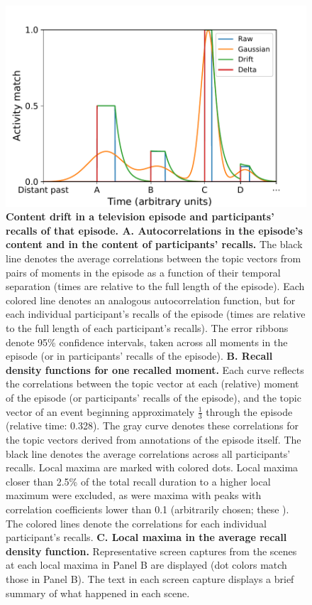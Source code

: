 \documentclass{article}
\begin{document}
\begin{figure}[tp] \centering \includegraphics[width=\textwidth]{figs/reinstatement} \caption{\textbf{Content drift in a television episode and participants' recalls of that episode.  A.  Autocorrelations in the episode's content and in the content of participants' recalls.}  The black line denotes the average correlations between the topic vectors from pairs of moments in the episode as a function of their temporal separation (times are relative to the full length of the episode).  Each colored line denotes an analogous autocorrelation function, but for each individual participant's recalls of the episode (times are relative to the full length of each participant's recalls).  The error ribbons denote 95\% confidence intervals, taken across all moments in the episode (or in participants' recalls of the episode).  \textbf{B. Recall density functions for one recalled moment.} Each curve reflects the correlations between the topic vector at each (relative) moment of the episode (or participants' recalls of the episode), and the topic vector of an event beginning approximately $\frac{1}{3}$ through the episode (relative time: 0.328).  The gray curve denotes these correlations for the topic vectors derived from annotations of the episode itself. The black line denotes the average correlations across all participants' recalls.  Local maxima are marked with colored dots.  Local maxima closer than 2.5\% of the total recall duration to a higher local maximum were excluded, as were maxima with peaks with correlation coefficients lower than 0.1 (arbitrarily chosen; these ).   The colored lines denote the correlations for each individual participant's recalls.  \textbf{C. Local maxima in the average recall density function.}  Representative screen captures from the scenes at each local maxima in Panel B are displayed (dot colors match those in Panel B).  The text in each screen capture displays a brief summary of what happened in each scene.}
\label{fig:reinstatement}
\end{figure}
\end{document}
